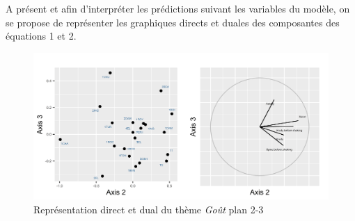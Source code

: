 \documentclass[a4paper,french,10pt]{article}
\begin{document}
\newpage

A présent et afin d'interpréter les prédictions suivant les variables du modèle, on se propose de représenter les graphiques directs et duales des composantes des équations 1 et 2.


\begin{figure}[htp] 
	\centering
	\hfill%
\end{figure}
\begin{figure}[htp] 
	\centering
	\includegraphics[scale=0.8]{images/Plot.IndVar_B3_2.3.png}
	\caption{Représentation direct et dual du thème \textit{Goût} plan 2-3}
\end{figure}
\end{document}

